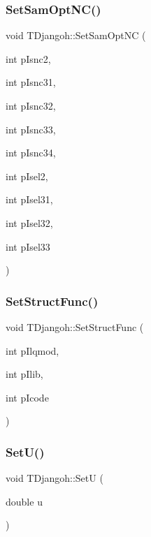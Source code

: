 \subsubsection{\texorpdfstring{Set\+Sam\+Opt\+N\+C()}{SetSamOptNC()}}
{\footnotesize\ttfamily void T\+Djangoh\+::\+Set\+Sam\+Opt\+NC (\begin{DoxyParamCaption}\item[{int}]{p\+Isnc2,  }\item[{int}]{p\+Isnc31,  }\item[{int}]{p\+Isnc32,  }\item[{int}]{p\+Isnc33,  }\item[{int}]{p\+Isnc34,  }\item[{int}]{p\+Isel2,  }\item[{int}]{p\+Isel31,  }\item[{int}]{p\+Isel32,  }\item[{int}]{p\+Isel33 }\end{DoxyParamCaption})}

\mbox{\label{class_t_djangoh_a163b31acdd2a9b30095cb72840c3404b}} 
\subsubsection{\texorpdfstring{Set\+Struct\+Func()}{SetStructFunc()}}
{\footnotesize\ttfamily void T\+Djangoh\+::\+Set\+Struct\+Func (\begin{DoxyParamCaption}\item[{int}]{p\+Ilqmod,  }\item[{int}]{p\+Ilib,  }\item[{int}]{p\+Icode }\end{DoxyParamCaption})}

\mbox{\label{class_t_djangoh_a69cebdc5dc26bfd0def872a996da0650}} 
\subsubsection{\texorpdfstring{Set\+U()}{SetU()}}
{\footnotesize\ttfamily void T\+Djangoh\+::\+SetU (\begin{DoxyParamCaption}\item[{double}]{u }\end{DoxyParamCaption})\hspace{0.3cm}{\ttfamily [inline]}}

